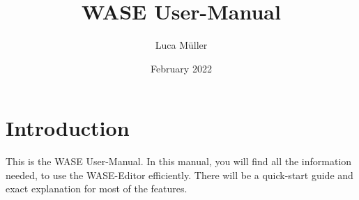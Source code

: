 \documentclass{article}
\title{WASE User-Manual}
\author{Luca Müller}
\date{February 2022}
\begin{document}
\maketitle

\section{Introduction}
This is the WASE User-Manual. In this manual, you will find all the information needed, 
to use the WASE-Editor efficiently. There will be a quick-start guide and exact explanation for most of the features.
\end{document}

